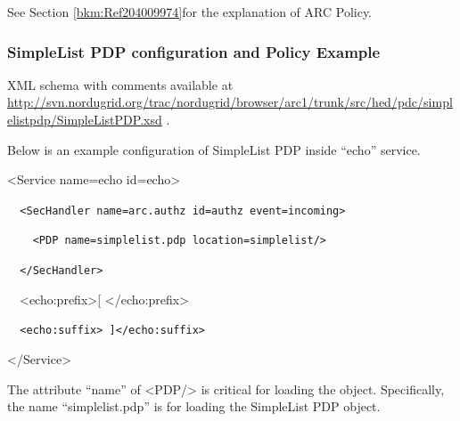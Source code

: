 \documentclass[a4paper]{article}
\newcommand\textstyleInternetlink[1]{\textcolor[rgb]{0.0,0.0,0.5019608}{#1}}
\begin{document}
{\upshape\color{black}
See Section \ref{bkm:Ref204009974}for the explanation of ARC Policy.}

\subsubsection{SimpleList PDP configuration and Policy Example}
{\upshape\color{black}
XML schema with comments available at
\href{http://svn.nordugrid.org/trac/nordugrid/browser/arc1/trunk/src/hed/pdc/simplelistpdp/SimpleListPDP.xsd}{\textstyleInternetlink{http://svn.nordugrid.org/trac/nordugrid/browser/arc1/trunk/src/hed/pdc/simplelistpdp/SimpleListPDP.}}\href{http://svn.nordugrid.org/trac/nordugrid/browser/arc1/trunk/src/hed/pdc/simplelistpdp/SimpleListPDP.xsd}{\textstyleInternetlink{xsd}}
.}

{\upshape\color{black}
Below is an example configuration of SimpleList PDP inside
{\textquotedblleft}echo{\textquotedblright} service.}

{\ttfamily\color{black}
{\textless}Service name={\textquotedbl}echo{\textquotedbl}
id={\textquotedbl}echo{\textquotedbl}{\textgreater}}

{\upshape\color{black}
\foreignlanguage{spanish}{\texttt{\ \ }}\texttt{{\textless}SecHandler
name={\textquotedbl}arc.authz{\textquotedbl}
id={\textquotedbl}authz{\textquotedbl}
event={\textquotedbl}incoming{\textquotedbl}{\textgreater}}}

{\upshape\color{black}
\texttt{\ \ \ \ {\textless}PDP
name={\textquotedbl}}\texttt{simplelist}\texttt{.pdp{\textquotedbl}}\texttt{
location=}\texttt{{\textquotedbl}}\texttt{simplelist}\texttt{{\textquotedbl}}\texttt{/}\texttt{{\textgreater}}}

{\upshape\color{black}
\texttt{\ \ }\foreignlanguage{spanish}{\texttt{{\textless}/SecHandler{\textgreater}}}}

{\ttfamily\color{black}
\ \ {\textless}echo:prefix{\textgreater}[
{\textless}/echo:prefix{\textgreater}}

{\upshape\color{black}
\foreignlanguage{spanish}{\texttt{\ \ }}\texttt{{\textless}echo:suffix{\textgreater}
]{\textless}/echo:suffix{\textgreater}}}

{\ttfamily\color{black}
{\textless}/Service{\textgreater}}

{\color{black}
The attribute {\textquotedblleft}name{\textquotedblright} of
{\textless}PDP/{\textgreater} is critical for loading the object.
Specifically, the name
{\textquotedblleft}simplelist.pdp{\textquotedblright} is for loading
the SimpleList PDP object.}
\end{document}
